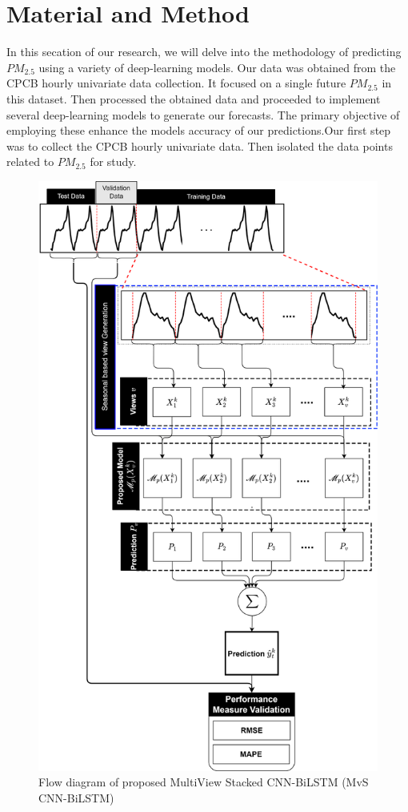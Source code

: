 \documentclass[a4paper, fleqn]{cas-sc}
\theoremstyle{definition}
\theoremstyle{remark}
\begin{document}
  



\section{Material and Method}
In this secation of our research,  we will delve into the methodology of predicting $PM_{2.5}$ using a variety of deep-learning models. Our data was obtained from the CPCB hourly univariate data collection. It focused on a single future $PM_{2.5}$ in this dataset. Then processed the obtained data and proceeded to implement several deep-learning models to generate our forecasts. The primary objective of employing these enhance the models accuracy of our predictions.Our first step was to collect the CPCB hourly univariate data. Then isolated the data points related to $PM_{2.5}$ for study.
\begin{figure}[h!]
	\centering
		\includegraphics[scale=0.6]{MvS CNN-BiLSTM}
	  \caption{Flow diagram of proposed MultiView Stacked CNN-BiLSTM (MvS CNN-BiLSTM)}\label{Muticbilstm}
\end{figure}
\end{document}

